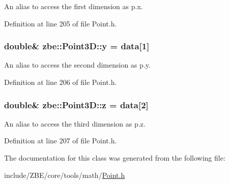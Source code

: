 An alias to access the first dimension as p.\+x. 



Definition at line 205 of file Point.\+h.

\hypertarget{classzbe_1_1_point3_d_a06bcb3860ed13dfce2d8e95d81fdbea9}{}
\subsubsection[{y}]{\setlength{\rightskip}{0pt plus 5cm}double\& zbe\+::\+Point3\+D\+::y = {\bf data}\mbox{[}1\mbox{]}}\label{classzbe_1_1_point3_d_a06bcb3860ed13dfce2d8e95d81fdbea9}


An alias to access the second dimension as p.\+y. 



Definition at line 206 of file Point.\+h.

\hypertarget{classzbe_1_1_point3_d_abfa9463b5314e1dbaa2db879ccbb71a4}{}
\subsubsection[{z}]{\setlength{\rightskip}{0pt plus 5cm}double\& zbe\+::\+Point3\+D\+::z = {\bf data}\mbox{[}2\mbox{]}}\label{classzbe_1_1_point3_d_abfa9463b5314e1dbaa2db879ccbb71a4}


An alias to access the third dimension as p.\+z. 



Definition at line 207 of file Point.\+h.



The documentation for this class was generated from the following file\+:\begin{DoxyCompactItemize}
\item 
include/\+Z\+B\+E/core/tools/math/\hyperlink{_point_8h}{Point.\+h}\end{DoxyCompactItemize}
